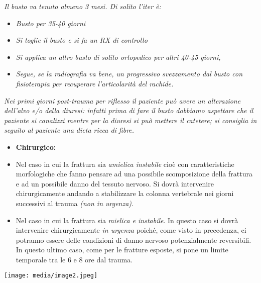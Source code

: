 \documentclass[]{article}
\begin{document}
\emph{Il busto va tenuto almeno 3 mesi. Di solito l'iter è:}

\begin{itemize}
\item
  \emph{Busto per 35-40 giorni}
\item
  \emph{Si toglie il busto e si fa un RX di controllo}
\item
  \emph{Si applica un altro busto di solito ortopedico per altri 40-45
  giorni,}
\item
  \emph{Segue, se la radiografia va bene, un progressivo svezzamento dal
  busto con fisioterapia per recuperare l'articolarità del rachide.}
\end{itemize}

\emph{Nei primi giorni post-trauma per riflesso il paziente può avere un
alterazione dell'alvo e/o della diuresi: infatti prima di fare il busto
dobbiamo aspettare che il paziente si canalizzi mentre per la diuresi si
può mettere il catetere; si consiglia in seguito al paziente una dieta
ricca di fibre.}

\begin{itemize}
\item
  \textbf{Chirurgico:}
\end{itemize}

\begin{itemize}
\item
  Nel caso in cui la frattura sia \emph{amielica instabile} cioè con
  caratteristiche morfologiche che fanno pensare ad una possibile
  scomposizione della frattura e ad un possibile danno del tessuto
  nervoso. Si dovrà intervenire chirurgicamente andando a stabilizzare
  la colonna vertebrale nei giorni successivi al trauma \emph{(non in
  urgenza)}.
\item
  Nel caso in cui la frattura sia \emph{mielica e instabile}. In questo
  caso si dovrà intervenire chirurgicamente \emph{in urgenza} poiché,
  come visto in precedenza, ci potranno essere delle condizioni di danno
  nervoso potenzialmente reversibili. In questo ultimo caso, come per le
  fratture esposte, si pone un limite temporale tra le 6 e 8 ore dal
  trauma.
\end{itemize}

\texttt{[image: media/image2.jpeg]}
\end{document}
